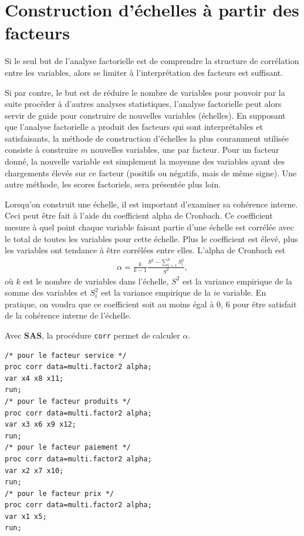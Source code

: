 \documentclass[
  11pt,
  letterpaper,
]{book}
\theoremstyle{definition}
\theoremstyle{definition}
\theoremstyle{definition}
\theoremstyle{remark}
\begin{document}
\hypertarget{construction-duxe9chelles-uxe0-partir-des-facteurs}{%
\section{Construction d'échelles à partir des facteurs}\label{construction-duxe9chelles-uxe0-partir-des-facteurs}}

Si le seul but de l'analyse factorielle est de comprendre la structure de corrélation entre les variables, alors se limiter à l'interprétation des facteurs est suffisant.

Si par contre, le but est de réduire le nombre de variables pour pouvoir par la suite procéder à d'autres analyses statistiques, l'analyse factorielle peut alors servir de guide pour construire de nouvelles variables (échelles). En supposant que l'analyse factorielle a produit des facteurs qui sont interprétables et satisfaisants, la méthode de construction d'échelles la plus couramment utilisée consiste à construire \(m\) nouvelles variables, une par facteur. Pour un facteur donné, la nouvelle variable est simplement la moyenne des variables ayant des chargements élevés sur ce facteur (positifs ou négatifs, mais de même signe). Une autre méthode, les scores factoriels, sera présentée plus loin.

Lorsqu'on construit une échelle, il est important d'examiner sa cohérence interne. Ceci peut être fait à l'aide du coefficient alpha de Cronbach. Ce coefficient mesure à quel point chaque variable faisant partie d'une échelle est corrélée avec le total de toutes les variables pour cette échelle.
Plus le coefficient est élevé, plus les variables ont tendance à être corrélées entre elles. L'alpha de Cronbach est
\begin{align*}
\alpha=\frac{k}{k-1} \frac{S^2-\sum_{i=1}^k S_i^2}{S^2}, 
\end{align*}
où \(k\) est le nombre de variables dans l'échelle, \(S^2\) est la variance empirique de la somme des variables et \(S_i^2\) est la variance empirique de la \(i\)e variable. En pratique, on voudra que ce coefficient soit au moins égal à 0, 6 pour être satisfait de la cohérence interne de l'échelle.

Avec \textbf{SAS}, la procédure \texttt{corr} permet de calculer \(\alpha\).

\begin{verbatim}
/* pour le facteur service */
proc corr data=multi.factor2 alpha;
var x4 x8 x11;
run;
/* pour le facteur produits */
proc corr data=multi.factor2 alpha;
var x3 x6 x9 x12;
run;
/* pour le facteur paiement */
proc corr data=multi.factor2 alpha;
var x2 x7 x10;
run;
/* pour le facteur prix */
proc corr data=multi.factor2 alpha;
var x1 x5;
run;
\end{verbatim}
\end{document}

